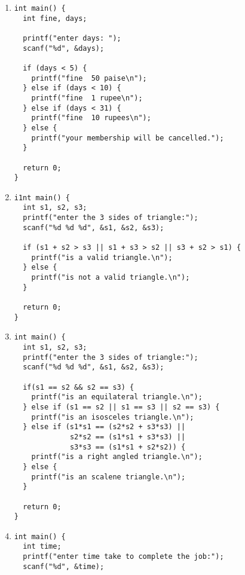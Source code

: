 \documentclass{report}
\begin{document}
\begin{enumerate}
\begin{verbatim}
  c1 = (hardness > 50)? 1: 0;
  c2 = (carbon < 0.7)? 1: 0;
  c3 = (tstrength > 5600)? 1: 0;

  if (c1 && c2 && c3) {
    grade = 10;
  } else if (c1 && c2 && !c3) {
    grade = 9;
  } else if (!c1 && c2 && c3) {
    grade = 8;
  } else if (c1 && !c2 && c3) {
    grade = 7;
  } else if (c1 || c2 || c3) {
    grade = 6;
  } else {
    grade = 5;
  }

  printf("grade = %d\n", grade);

  return 0;
}
  \end{verbatim}
\item \begin{verbatim}
int main() {
  int fine, days;

  printf("enter days: ");
  scanf("%d", &days);

  if (days < 5) {
    printf("fine  50 paise\n");
  } else if (days < 10) {
    printf("fine  1 rupee\n");
  } else if (days < 31) {
    printf("fine  10 rupees\n");
  } else {
    printf("your membership will be cancelled.");
  }

  return 0;
}
  \end{verbatim}
\item \begin{verbatim}
i1nt main() {
  int s1, s2, s3;
  printf("enter the 3 sides of triangle:");
  scanf("%d %d %d", &s1, &s2, &s3);

  if (s1 + s2 > s3 || s1 + s3 > s2 || s3 + s2 > s1) {
    printf("is a valid triangle.\n");
  } else {
    printf("is not a valid triangle.\n");
  }

  return 0;
}
  \end{verbatim}
\item \begin{verbatim}
int main() {
  int s1, s2, s3;
  printf("enter the 3 sides of triangle:");
  scanf("%d %d %d", &s1, &s2, &s3);

  if(s1 == s2 && s2 == s3) {
    printf("is an equilateral triangle.\n");
  } else if (s1 == s2 || s1 == s3 || s2 == s3) {
    printf("is an isosceles triangle.\n");
  } else if (s1*s1 == (s2*s2 + s3*s3) || 
             s2*s2 == (s1*s1 + s3*s3) || 
             s3*s3 == (s1*s1 + s2*s2)) {
    printf("is a right angled triangle.\n");
  } else {
    printf("is an scalene triangle.\n");
  }

  return 0;
}
  \end{verbatim}
\item \begin{verbatim}
int main() {
  int time;
  printf("enter time take to complete the job:");
  scanf("%d", &time);


\end{verbatim}
\end{enumerate}
\end{document}
